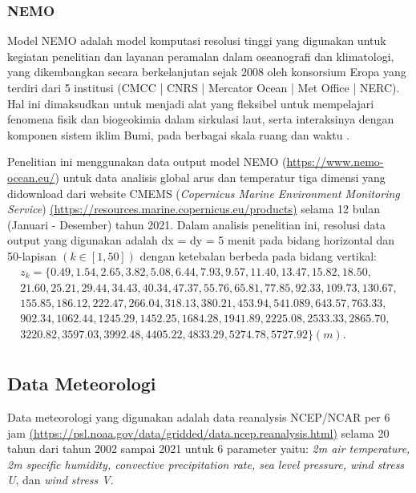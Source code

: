 \begin{spacing}{1.5}
\subsubsection[NEMO]{NEMO}
	Model NEMO adalah model komputasi resolusi tinggi yang digunakan untuk kegiatan penelitian dan layanan peramalan dalam oseanografi dan klimatologi, yang dikembangkan secara berkelanjutan sejak 2008 oleh konsorsium Eropa yang terdiri dari 5 institusi (CMCC | CNRS | Mercator Ocean | Met Office | NERC). Hal ini dimaksudkan untuk menjadi alat yang fleksibel untuk mempelajari fenomena fisik dan biogeokimia dalam sirkulasi laut, serta interaksinya dengan komponen sistem iklim Bumi, pada berbagai skala ruang dan waktu . 
	
	Penelitian ini menggunakan data output model NEMO (\href{https://www.nemo-ocean.eu/}{https://www.nemo-ocean.eu/}) untuk data analisis global arus dan temperatur tiga dimensi yang didownload dari website CMEMS (\textit{Copernicus Marine Environment Monitoring Service}) \href{https://resources.marine.copernicus.eu/products}{(https://resources.marine.copernicus.eu/products)} selama 12 bulan (Januari - Desember) tahun 2021.  Dalam analisis penelitian ini, resolusi data output yang digunakan adalah dx = dy = 5 menit pada bidang horizontal dan 50-lapisan $(k \in [1,50])$ dengan ketebalan berbeda pada bidang vertikal:
	\begin{equation*}
		\begin{aligned}
			z_k = \{0.49, 1.54, 2.65, 3.82, 5.08, 6.44, 7.93, 9.57, 11.40, 13.47, 15.82, 18.50, \\
			21.60, 25.21, 29.44, 34.43, 40.34, 47.37, 55.76, 65.81, 77.85, 92.33, 109.73, 130.67, \\
			155.85, 186.12, 222.47, 266.04, 318.13, 380.21, 453.94, 541.089, 643.57, 763.33, \\
			902.34, 1062.44, 1245.29, 1452.25, 1684.28, 1941.89, 2225.08, 2533.33, 2865.70,  \\
			3220.82, 3597.03, 3992.48, 4405.22, 4833.29, 5274.78, 5727.92 \} (m). \\
		\end{aligned}
	\end{equation*}

\subsection[Data Meteorologi]{Data Meteorologi}
	Data meteorologi yang digunakan adalah data reanalysis NCEP/NCAR per 6 jam \href{https://psl.noaa.gov/data/gridded/data.ncep.reanalysis.html}{(https://psl.noaa.gov/data/gridded/data.ncep.reanalysis.html)} selama 20 tahun dari tahun 2002 sampai 2021 untuk 6 parameter yaitu: \textit{2m air temperature, 2m specific humidity, convective precipitation rate, sea level pressure, wind stress U}, dan \textit{wind stress V}.
\end{spacing}
\vspace{-0.5pc}
